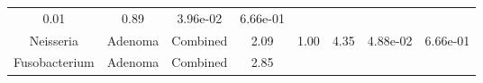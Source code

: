\documentclass[12pt,]{article}
\begin{document}
\begin{longtable}[]{@{}cccccccc@{}}
\begin{minipage}[t]{0.13\columnwidth}
0.01\strut
\end{minipage} & \begin{minipage}[t]{0.13\columnwidth}\centering\strut
0.89\strut
\end{minipage} & \begin{minipage}[t]{0.07\columnwidth}\centering\strut
3.96e-02\strut
\end{minipage} & \begin{minipage}[t]{0.07\columnwidth}\centering\strut
6.66e-01\strut
\end{minipage}\tabularnewline
\begin{minipage}[t]{0.16\columnwidth}\centering\strut
Neisseria\strut
\end{minipage} & \begin{minipage}[t]{0.08\columnwidth}\centering\strut
Adenoma\strut
\end{minipage} & \begin{minipage}[t]{0.09\columnwidth}\centering\strut
Combined\strut
\end{minipage} & \begin{minipage}[t]{0.05\columnwidth}\centering\strut
2.09\strut
\end{minipage} & \begin{minipage}[t]{0.13\columnwidth}\centering\strut
1.00\strut
\end{minipage} & \begin{minipage}[t]{0.13\columnwidth}\centering\strut
4.35\strut
\end{minipage} & \begin{minipage}[t]{0.07\columnwidth}\centering\strut
4.88e-02\strut
\end{minipage} & \begin{minipage}[t]{0.07\columnwidth}\centering\strut
6.66e-01\strut
\end{minipage}\tabularnewline
\begin{minipage}[t]{0.16\columnwidth}\centering\strut
Fusobacterium\strut
\end{minipage} & \begin{minipage}[t]{0.08\columnwidth}\centering\strut
Adenoma\strut
\end{minipage} & \begin{minipage}[t]{0.09\columnwidth}\centering\strut
Combined\strut
\end{minipage} & \begin{minipage}[t]{0.05\columnwidth}\centering\strut
2.85\strut
\end{minipage} & \begin{minipage}[t]{0.13\columnwidth}\centering\strut

\end{minipage}
\end{longtable}
\end{document}

